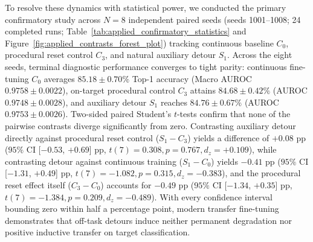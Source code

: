 \documentclass[sn-mathphys,Numbered]{sn-jnl}
\begin{document}
\begin{table}[t]
\caption{Primary confirmatory inferential statistics for applied vision fine-tuning on ISIC 2019 across $N = 8$ independent paired seeds (seeds 1001--1008). Contrasts are evaluated via two-sided paired Student's $t$-tests on terminal Top-1 accuracy (percentage points).}\label{tab:applied_confirmatory_statistics}
\centering
\renewcommand{\arraystretch}{0.92}
\end{table}

To resolve these dynamics with statistical power, we conducted the primary confirmatory study across $N = 8$ independent paired seeds (seeds 1001--1008; 24 completed runs; Table~\ref{tab:applied_confirmatory_statistics} and Figure~\ref{fig:applied_contrasts_forest_plot}) tracking continuous baseline $C_0$, procedural reset control $C_3$, and natural auxiliary detour $S_1$. Across the eight seeds, terminal diagnostic performance converges to tight parity: continuous fine-tuning $C_0$ averages $85.18 \pm 0.70\%$ Top-1 accuracy (Macro AUROC $0.9758 \pm 0.0022$), on-target procedural control $C_3$ attains $84.68 \pm 0.42\%$ (AUROC $0.9748 \pm 0.0028$), and auxiliary detour $S_1$ reaches $84.76 \pm 0.67\%$ (AUROC $0.9753 \pm 0.0026$). Two-sided paired Student's $t$-tests confirm that none of the pairwise contrasts diverge significantly from zero. Contrasting auxiliary detour directly against procedural reset control ($S_1 - C_3$) yields a difference of $+0.08$ pp ($95\%$ CI [$-0.53$, $+0.69$] pp, $t(7) = 0.308, p = 0.767, d_z = +0.109$), while contrasting detour against continuous training ($S_1 - C_0$) yields $-0.41$ pp ($95\%$ CI [$-1.31$, $+0.49$] pp, $t(7) = -1.082, p = 0.315, d_z = -0.383$), and the procedural reset effect itself ($C_3 - C_0$) accounts for $-0.49$ pp ($95\%$ CI [$-1.34$, $+0.35$] pp, $t(7) = -1.384, p = 0.209, d_z = -0.489$). With every confidence interval bounding zero within half a percentage point, modern transfer fine-tuning demonstrates that off-task detours induce neither permanent degradation nor positive inductive transfer on target classification.
\end{document}
